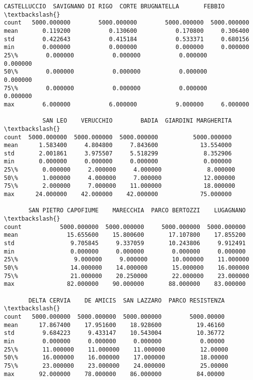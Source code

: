 \documentclass[11pt]{article}
\makeatletter
\newcommand{\boxspacing}{\kern\kvtcb@left@rule\kern\kvtcb@boxsep}
\newcommand{\prompt}[4]{
        {\ttfamily\llap{{\color{#2}[#3]:\hspace{3pt}#4}}\vspace{-\baselineskip}}
    }
\makeatother
\begin{document}
            \begin{tcolorbox}[breakable, size=fbox, boxrule=.5pt, pad at break*=1mm, opacityfill=0]
\prompt{Out}{outcolor}{22}{\boxspacing}
\begin{Verbatim}[commandchars=\\\{\}]
       CASTELLUCCIO  SAVIGNANO DI RIGO  CORTE BRUGNATELLA       FEBBIO  \textbackslash{}
count   5000.000000        5000.000000        5000.000000  5000.000000
mean       0.119200           0.130600           0.170800     0.306400
std        0.422643           0.415184           0.533371     0.680156
min        0.000000           0.000000           0.000000     0.000000
25\%        0.000000           0.000000           0.000000     0.000000
50\%        0.000000           0.000000           0.000000     0.000000
75\%        0.000000           0.000000           0.000000     0.000000
max        6.000000           6.000000           9.000000     6.000000

           SAN LEO    VERUCCHIO        BADIA  GIARDINI MARGHERITA  \textbackslash{}
count  5000.000000  5000.000000  5000.000000          5000.000000
mean      1.583400     4.804800     7.843600            13.554000
std       2.001861     3.975507     5.518299             8.352906
min       0.000000     0.000000     0.000000             0.000000
25\%       0.000000     2.000000     4.000000             8.000000
50\%       1.000000     4.000000     7.000000            12.000000
75\%       2.000000     7.000000    11.000000            18.000000
max      24.000000    42.000000    42.000000            75.000000

       SAN PIETRO CAPOFIUME    MARECCHIA  PARCO BERTOZZI    LUGAGNANO  \textbackslash{}
count           5000.000000  5000.000000     5000.000000  5000.000000
mean              15.655600    15.800600       17.107800    17.855200
std                9.705845     9.337059       10.243806     9.912491
min                0.000000     0.000000        0.000000     0.000000
25\%                9.000000     9.000000       10.000000    11.000000
50\%               14.000000    14.000000       15.000000    16.000000
75\%               21.000000    20.250000       22.000000    23.000000
max               82.000000    90.000000       88.000000    83.000000

       DELTA CERVIA    DE AMICIS  SAN LAZZARO  PARCO RESISTENZA  \textbackslash{}
count   5000.000000  5000.000000  5000.000000        5000.00000
mean      17.867400    17.951600    18.928600          19.46160
std        9.684223     9.433147    10.543004          10.36772
min        0.000000     0.000000     0.000000           0.00000
25\%       11.000000    11.000000    11.000000          12.00000
50\%       16.000000    16.000000    17.000000          18.00000
75\%       23.000000    23.000000    24.000000          25.00000
max       92.000000    78.000000    86.000000          84.00000


\end{Verbatim}
\end{tcolorbox}
\end{document}
